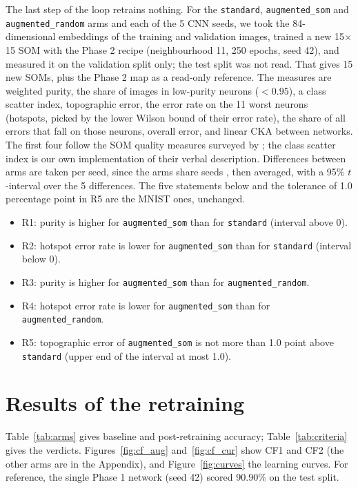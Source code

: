 \documentclass[11pt]{article}
\begin{document}
The last step of the loop retrains nothing. For the \texttt{standard}, \texttt{augmented\_som} and \texttt{augmented\_random} arms and each of the 5 CNN seeds, we took the 84-dimensional embeddings of the training and validation images, trained a new 15$\times$15 SOM with the Phase 2 recipe (neighbourhood 11, 250 epochs, seed 42), and measured it on the validation split only; the test split was not read. That gives 15 new SOMs, plus the Phase 2 map as a read-only reference. The measures are weighted purity, the share of images in low-purity neurons ($<0.95$), a class scatter index, topographic error, the error rate on the 11 worst neurons (hotspots, picked by the lower Wilson bound of their error rate), the share of all errors that fall on those neurons, overall error, and linear CKA \parencite{kornblith2019cka} between networks. The first four follow the SOM quality measures surveyed by \textcite{forest2020somsurvey}; the class scatter index is our own implementation of their verbal description. Differences between arms are taken per seed, since the arms share seeds \parencite{bouthillier2021variance}, then averaged, with a 95\% $t$-interval over the 5 differences. The five statements below and the tolerance of 1.0 percentage point in R5 are the MNIST ones, unchanged.

\begin{itemize}[leftmargin=1.4em, itemsep=1pt]
  \item R1: purity is higher for \texttt{augmented\_som} than for \texttt{standard} (interval above 0).
  \item R2: hotspot error rate is lower for \texttt{augmented\_som} than for \texttt{standard} (interval below 0).
  \item R3: purity is higher for \texttt{augmented\_som} than for \texttt{augmented\_random}.
  \item R4: hotspot error rate is lower for \texttt{augmented\_som} than for \texttt{augmented\_random}.
  \item R5: topographic error of \texttt{augmented\_som} is not more than 1.0 point above \texttt{standard} (upper end of the interval at most 1.0).
\end{itemize}

\section{Results of the retraining}

Table~\ref{tab:arms} gives baseline and post-retraining accuracy; Table~\ref{tab:criteria} gives the verdicts. Figures~\ref{fig:cf_aug} and~\ref{fig:cf_cur} show CF1 and CF2 (the other arms are in the Appendix), and Figure~\ref{fig:curves} the learning curves. For reference, the single Phase 1 network (seed 42) scored 90.90\% on the test split.
\end{document}
